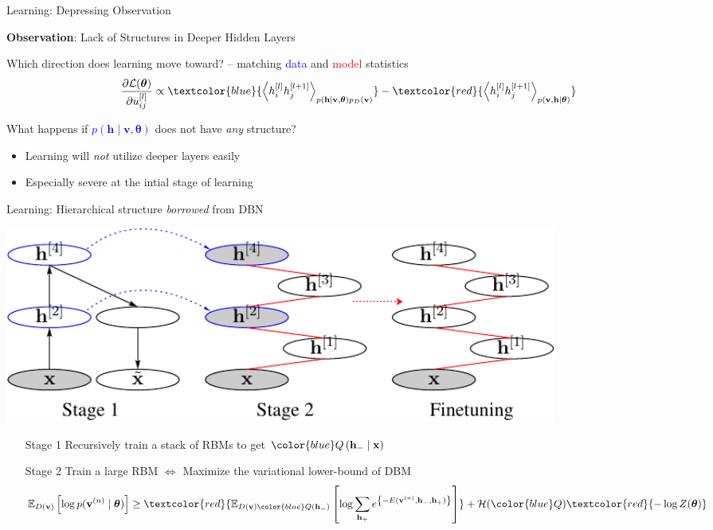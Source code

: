 \documentclass{beamer}
\newcommand{\qlay}[1]{\left[#1\right]}
\newcommand{\vect}[1]{\mathbf{#1}}
\newcommand{\vects}[1]{\boldsymbol{#1}}
\newcommand{\vh}[0]{\vect{h}}
\newcommand{\vv}[0]{\vect{v}}
\newcommand{\vx}[0]{\vect{x}}
\newcommand{\TT}[0]{{\vects{\theta}}}
\newcommand{\LL}[0]{\mathcal{L}}
\newcommand{\HH}[0]{\mathcal{H}}
\newcommand{\E}[0]{\mathbb{E}}
\newcommand{\tred}[1]{\textcolor{red}{#1}}
\newcommand{\tblue}[1]{\textcolor{blue}{#1}}
\begin{document}
\begin{frame}{Learning: Depressing Observation}

\textbf{Observation}: Lack of Structures in Deeper Hidden Layers

\vspace{4mm}
Which direction does learning move toward? -- matching
\tblue{data} and \tred{model} statistics
\begin{align*}
    \frac{\partial \LL(\TT)}{\partial u^{\qlay{l}}_{ij}} \propto
    \textcolor{blue}{\left< h^{\qlay{l}}_i h^{\qlay{l+1}}_j
    \right>_{p\left(\vh \mid \vv,
    \TT\right)p_D\left(\vv\right) } }
    -
    \textcolor{red}{\left< h^{\qlay{l}}_i h^{\qlay{l+1}}_j
    \right>_{p\left(\vv, \vh \mid \TT\right)}}
\end{align*}

\vspace{4mm}
What happens if \tblue{$p(\vh \mid \vv, \TT)$} does not
have \textit{any} structure?
\begin{itemize}
    \item Learning will \textit{not} utilize deeper layers easily
    \item Especially severe at the intial stage of
        learning
\end{itemize}
\end{frame}


\begin{frame}{Learning: Hierarchical structure \emph{borrowed} from DBN}
\begin{center}
\includegraphics[width=0.8\textwidth]{two_stage.pdf}
\end{center}

\begin{itemize}
\item[Stage 1] Recursively train a stack of RBMs to get
$\color{blue}Q\left(\vh_-\mid\vx\right)$
\item[Stage 2] Train a large RBM $\iff$ Maximize the variational
lower-bound of DBM
        {
        \small
        \begin{align*}
            \E_{D(\vv)} \left[ \log p(\vv^{(n)} \mid \TT) \right]
            \geq 
            \textcolor{red}{\E_{D(\vv){\color{blue}Q(\vh_-)}} \left[ \log \sum_{\vh_+} e^{\left\{ -E
            (\vv^{(n)}, \vh_-, \vh_+)\right\}} \right]}
            + \HH({\color{blue}Q}) \textcolor{red}{- \log Z(\TT)}
        \end{align*}
        }
\end{itemize}
\end{frame}
\end{document}
